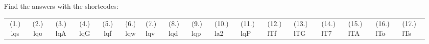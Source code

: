       
    
  \label{464e844ca5615087ea89d9d95dd9a43a**end}
    
\par {} Find the answers with the shortcodes:
 \par \begin{tabular}[h]{cccccc}
 (1.) lqs  &  (2.) lqo  &  (3.) lqA  &  (4.) lqG  &  (5.) lqf  &  (6.) lqw  &  (7.) lqv  &  (8.) lqd  &  (9.) lqp  &  (10.) la2  &  (11.) lqP  &  (12.) lTf  &  (13.) lTG  &  (14.) lT7  &  (15.) lTA  &  (16.) lTo  &  (17.) lTs  & \end{tabular}



